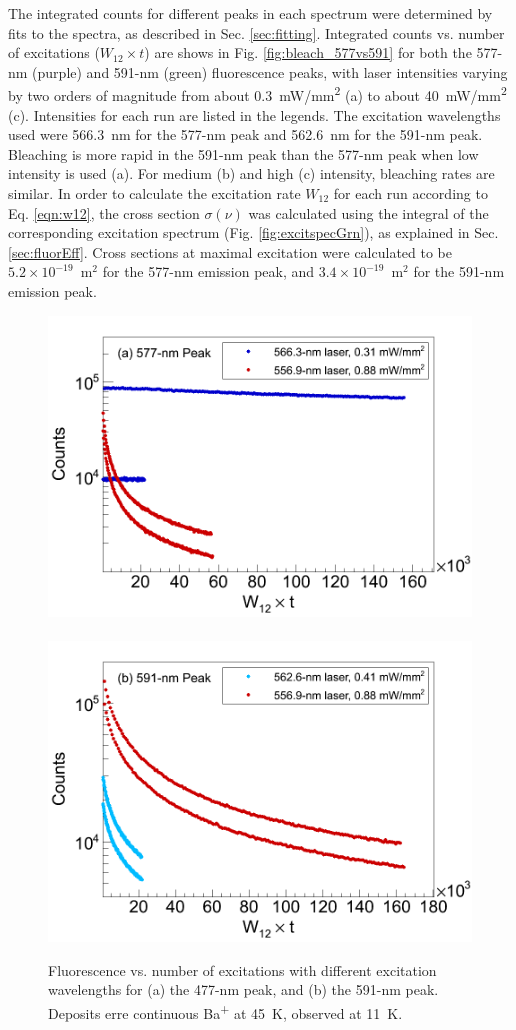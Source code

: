 The integrated counts for different peaks in each spectrum were determined by fits to the spectra, as described in Sec. \ref{sec:fitting}.  Integrated counts vs. number of excitations ($W_{12} \times t$) are shows in Fig. \ref{fig:bleach_577vs591} for both the 577-nm (purple) and 591-nm (green) fluorescence peaks, with laser intensities varying by two orders of magnitude from about 0.3~mW/mm\textsuperscript{2} (a) to about 40~mW/mm\textsuperscript{2} (c).  Intensities for each run are listed in the legends.  The excitation wavelengths used were 566.3~nm for the 577-nm peak and 562.6~nm for the 591-nm peak.  Bleaching is more rapid in the 591-nm peak than the 577-nm peak when low intensity is used (a).  For medium (b) and high (c) intensity, bleaching rates are similar.  In order to calculate the excitation rate $W_{12}$ for each run according to Eq. \ref{eqn:w12}, the cross section $\sigma(\nu)$ was calculated using the integral of the corresponding excitation spectrum (Fig. \ref{fig:excitspecGrn}), as explained in Sec. \ref{sec:fluorEff}.  Cross sections at maximal excitation were calculated to be $5.2 \times 10^{-19}$~m$^{2}$ for the 577-nm emission peak, and $3.4 \times 10^{-19}$~m$^{2}$ for the 591-nm emission peak.

\begin{figure} %
        \centering
                \includegraphics[width=.5\textwidth]{figures/bleach_compareExcitations_specificSigmas_a.png}
                ~
                \includegraphics[width=.5\textwidth]{figures/bleach_compareExcitations_specificSigmas_b.png}
                \caption{Fluorescence vs. number of excitations with different excitation wavelengths for (a) the 477-nm peak, and (b) the 591-nm peak.  Deposits erre continuous Ba\textsuperscript{+} at 45~K, observed at 11~K.}
\label{fig:bleach_excitCompare}
\end{figure}

